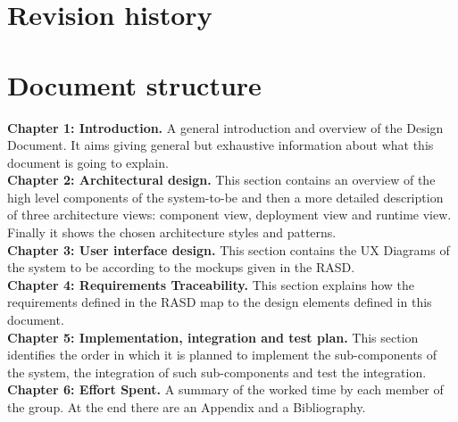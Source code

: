 \documentclass[../RASD.tex]{subfiles}
\begin{document}
    \section{Revision history}\label{sec:revision-history}
    \section{Document structure}\label{sec:document-structure}
    \textbf{Chapter 1: Introduction.}
    A general introduction and overview of the Design Document.
    It aims giving general but exhaustive information about what this document is going to explain.
    \\
    \textbf{Chapter 2: Architectural design.}
    This section contains an overview of the high level components of the system-to-be and then a more detailed description of three architecture views:
    component view, deployment view and runtime view.
    Finally it shows the chosen architecture styles and patterns.
    \\
    \textbf{Chapter 3: User interface design.}
    This section contains the UX Diagrams of the system to be according to the mockups given in the RASD.
    \\
    \textbf{Chapter 4: Requirements Traceability.}
    This section explains how the requirements defined in the RASD map to the design elements defined in this document.
    \\
    \textbf{Chapter 5: Implementation, integration and test plan.}
    This section identifies the order in which it is planned to implement the sub-components of the system,
    the integration of such sub-components and test the integration.
    \\
    \textbf{Chapter 6: Effort Spent.} A summary of the worked time by each member of the group.
    At the end there are an Appendix and a Bibliography.
\end{document}

